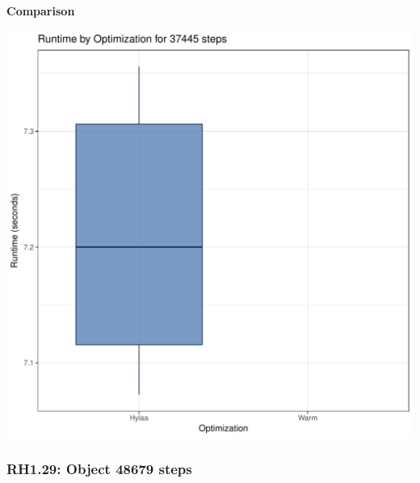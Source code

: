 \documentclass{article}\usepackage[]{graphicx}\usepackage[]{color}
\makeatletter
\def\maxwidth{ %
  \ifdim\Gin@nat@width>\linewidth
    \linewidth
  \else
    \Gin@nat@width
  \fi
}
\newenvironment{knitrout}{}{} %
\makeatother
\begin{document}
 \textbf{Comparison}
  
\begin{knitrout}
\color{fgcolor}
\includegraphics[width=\maxwidth]{figure/RH1_steps37445-1} 

\end{knitrout}


\subsubsection{RH1.29: Object 48679 steps}
\end{document}

